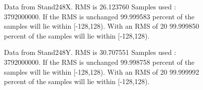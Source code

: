 \begin{figure}[ht] 				 				 				\caption{Data from Stand248X. RMS is 26.123760 Samples used : 3792000000. If the RMS is unchanged 99.999583 percent of the samples will lie within [-128,128).  				 With an RMS of 20 99.999850 percent of the samples will lie within [-128,128).} 				\end{figure} 

\begin{figure}[ht] 				 				 				\caption{Data from Stand248Y. RMS is 30.707551 Samples used : 3792000000. If the RMS is unchanged 99.998758 percent of the samples will lie within [-128,128).  				 With an RMS of 20 99.999992 percent of the samples will lie within [-128,128).} 				\end{figure} 

